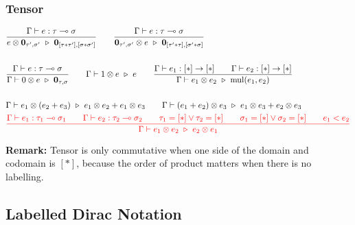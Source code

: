\subsubsection*{Tensor}
\begin{align*}
  & \frac{\Gamma \vdash e : \tau \multimap \sigma}{e \otimes \textbf{0}_{\tau', \sigma'} \ \triangleright\ \textbf{0}_{[\tau * \tau'], [\sigma * \sigma']}}
  \qquad 
  \frac{\Gamma \vdash e : \tau \multimap \sigma}{\textbf{0}_{\tau', \sigma'} \otimes e \ \triangleright\ \textbf{0}_{[\tau' * \tau], [\sigma' * \sigma]}}\\
  & \ \\
  & \frac{\Gamma \vdash e : \tau \multimap \sigma}{\Gamma \vdash 0 \otimes e \ \triangleright\ \mathbf{0}_{\tau,\sigma}}
  \qquad
  \Gamma \vdash 1 \otimes e \ \triangleright\ e
  \qquad 
  \frac{\Gamma \vdash e_1 : [*] \to [*] \qquad \Gamma \vdash e_2 : [*] \to [*]}{\Gamma \vdash e_1 \otimes e_2 \ \triangleright\ \mathrm{mul}(e_1, e_2)}\\
  & \ \\
  & \Gamma \vdash e_1 \otimes (e_2 + e_3) \ \triangleright\ e_1 \otimes e_2 + e_1 \otimes e_3
  \qquad 
  \Gamma \vdash (e_1 + e_2) \otimes e_3 \ \triangleright\ e_1 \otimes e_3 + e_2 \otimes e_3\\
  & 
  \textcolor{red}{
  \frac{\Gamma \vdash e_1 : \tau_1 \multimap \sigma_1 \qquad \Gamma \vdash e_2 : \tau_2 \multimap \sigma_2 \qquad \tau_1 = [*] \vee \tau_2 = [*]\qquad \sigma_1 = [*] \vee \sigma_2 = [*] \qquad e_1 < e_2}{\Gamma \vdash e_1 \otimes e_2 \ \triangleright\ e_2 \otimes e_1}}
\end{align*}

\textbf{Remark: } Tensor is only commutative when one side of the domain and codomain is $[*]$, because the order of product matters when there is no labelling.





\subsection{Labelled Dirac Notation}


